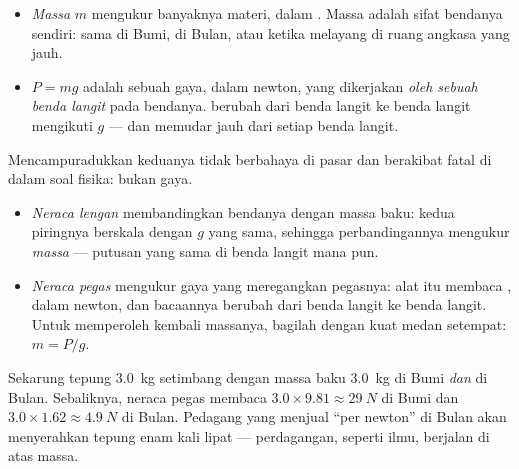 \begin{remark}\label{rem:g10:universal-gravitation:massweight}
\begin{itemize}
  \item \emph{Massa} $m$ mengukur banyaknya materi, dalam .
        Massa adalah sifat bendanya sendiri: sama di Bumi, di Bulan,
        atau ketika melayang di ruang angkasa yang jauh.
  \item \emph{} $P = mg$ adalah sebuah gaya, dalam newton, yang
        dikerjakan \emph{oleh sebuah benda langit} pada bendanya.
         berubah dari benda langit ke benda langit mengikuti $g$
        --- dan memudar jauh dari setiap benda langit.
\end{itemize}
Mencampuradukkan keduanya tidak berbahaya di pasar dan berakibat fatal
di dalam soal fisika:  bukan  gaya.
\end{remark}

\begin{method}\label{met:g10:universal-gravitation:instruments}
\begin{itemize}
  \item \emph{Neraca lengan} membandingkan bendanya dengan massa
        baku:  kedua piringnya berskala dengan $g$ yang sama,
        sehingga perbandingannya mengukur \emph{massa} --- putusan yang
        sama di benda langit mana pun.
  \item \emph{Neraca pegas} mengukur gaya yang meregangkan pegasnya:
        alat itu membaca \emph{}, dalam newton, dan bacaannya
        berubah dari benda langit ke benda langit. Untuk memperoleh
        kembali massanya, bagilah dengan kuat medan setempat:
        $m = P/g$.
\end{itemize}
\end{method}

\begin{example}\label{ex:g10:universal-gravitation:flour}
Sekarung tepung \qty{3.0}{kg} setimbang dengan massa baku \qty{3.0}{kg}
di Bumi \emph{dan} di Bulan. Sebaliknya, neraca pegas membaca
$3.0 \times 9.81 \approx \qty{29}{N}$ di Bumi dan
$3.0 \times 1.62 \approx \qty{4.9}{N}$ di Bulan. Pedagang yang menjual
``per newton'' di Bulan akan menyerahkan tepung enam kali lipat ---
perdagangan, seperti ilmu, berjalan di atas massa.
\end{example}

